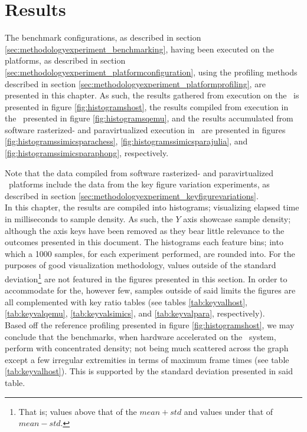 
\chapter{Results}
\label{cha:results}
The benchmark configurations, as described in section \ref{sec:methodologyexperiment_benchmarking}, having been executed on the platforms, as described in section \ref{sec:methodologyexperiment_platformconfiguration}, using the profiling methods described in section \ref{sec:methodologyexperiment_platformprofiling}, are presented in this chapter.
As such, the results gathered from execution on the \dvttermhost\ is presented in figure \ref{fig:histogramshost}, the results compiled from execution in the \dvttermandroidemulator\ presented in figure \ref{fig:histogramsqemu}, and the results accumulated from software rasterized- and paravirtualized execution in \dvttermsimics\ are presented in figures \ref{fig:histogramssimicsparachess}, \ref{fig:histogramssimicsparajulia}, and \ref{fig:histogramssimicsparaphong}, respectively.

Note that the data compiled from software rasterized- and paravirtualized \dvttermsimics\ platforms include the data from the key figure variation experiments, as described in section \ref{sec:methodologyexperiment_keyfigurevariations}.\\

\noindent
In this chapter, the results are compiled into histograms; visualizing elapsed time in milliseconds to sample density.
As such, the $Y$ axis showcase sample density; although the axis keys have been removed as they bear little relevance to the outcomes presented in this document.
The histograms each feature  bins; into which a 1000 samples, for each experiment performed, are rounded into.
For the purposes of good visualization methodology, values outside of the standard deviation\footnote{That is; values above that of the $mean + std$ and values under that of $mean - std$.} are not featured in the figures presented in this section.
In order to accommodate for the, however few, samples outside of said limits the figures are all complemented with key ratio tables (see tables \ref{tab:keyvalhost}, \ref{tab:keyvalqemu}, \ref{tab:keyvalsimics}, and \ref{tab:keyvalpara}, respectively).\\

\noindent
Based off the reference profiling presented in figure \ref{fig:histogramshost}, we may conclude that the benchmarks, when hardware accelerated on the \dvttermhost\ system, perform with concentrated density; not being much scattered across the graph except a few irregular extremities in terms of maximum frame times (see table \ref{tab:keyvalhost}).
This is supported by the standard deviation presented in said table.

